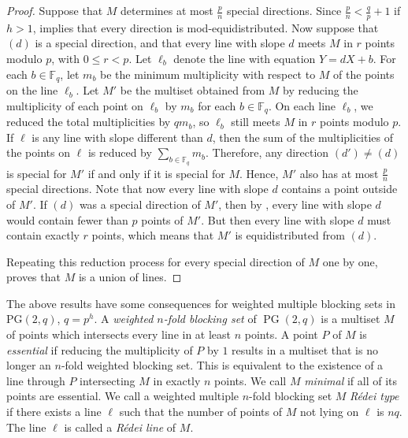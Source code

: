 \documentclass[12pt, a4paper]{article}
\theoremstyle{definition}
\newcommand{\FF}{\mathbb F}
\DeclareMathOperator{\PG}{PG}
\newcommand{\pg}{\PG}
\begin{document}
\begin{proof}
Suppose that $M$ determines at most $\frac pn$ special directions.
Since $\frac{p}{n} < \frac{q}{p} + 1$ if $h> 1$,  implies that every direction is mod-equidistributed.
Now suppose that $(d)$ is a special direction, and that every line with slope $d$ meets $M$ in $r$ points modulo $p$, with $0 \leq r < p$.
Let $\ell_b$ denote the line with equation $Y = dX + b$.
For each $b \in \FF_q$, let $m_b$ be the minimum multiplicity with respect to $M$ of the points on the line $\ell_b$.
Let $M'$ be the multiset obtained from $M$ by reducing the multiplicity of each point on $\ell_b$ by $m_b$ for each $b \in \FF_q$.
On each line $\ell_b$, we reduced the total multiplicities by $q m_b$, so $\ell_b$ still meets $M$ in $r$ points modulo $p$.
If $\ell$ is any line with slope different than $d$, then the sum of the multiplicities of the points on $\ell$ is reduced by $\sum_{b \in \FF_q} m_b$.
Therefore, any direction $(d') \neq (d)$ is special for $M'$ if and only if it is special for $M$.
Hence, $M'$ also has at most $\frac pn$ special directions.
Note that now every line with slope $d$ contains a point outside of $M'$. If $(d)$ was a special direction of $M'$, then by , every line with slope $d$ would contain fewer than $p$ points of $M'$. 
But then every line with slope $d$ must contain exactly $r$ points, which means that $M'$ is equidistributed from $(d)$.

Repeating this reduction process for every special direction of $M$ one by one, proves that $M$ is a union of lines.
\end{proof}

The above results have some consequences for weighted multiple blocking sets in PG$(2,q)$, $q=p^h$.
A \emph{weighted $n$-fold blocking set} of $\pg(2,q)$ is a multiset $M$ of points which intersects every line in at least $n$ points.
A point $P$ of $M$ is \emph{essential} if reducing the multiplicity of $P$ by $1$ results in a multiset that is no longer an $n$-fold weighted blocking set.
This is equivalent to the existence of a line through $P$ intersecting $M$ in exactly $n$ points.
We call $M$ \emph{minimal} if all of its points are essential.
We call a weighted multiple $n$-fold blocking set $M$ \emph{R\'edei type} if there exists a line $\ell$ such that the number of points of $M$ not lying on $\ell$ is $nq$.
The line $\ell$ is called a \emph{R\'edei line} of $M$.
\end{document}

